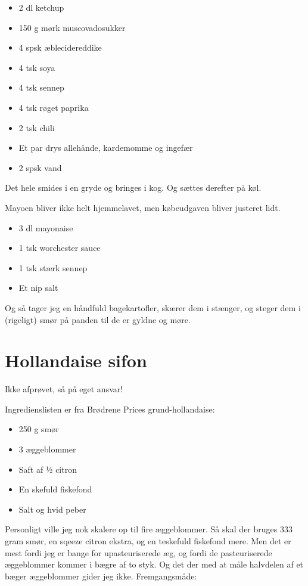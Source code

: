 \documentclass[
]{book}
\providecommand{\tightlist}{%
  \setlength{\itemsep}{0pt}\setlength{\parskip}{0pt}}
\begin{document}
\begin{itemize}
\tightlist
\item
  2 dl ketchup
\item
  150 g mørk muscovadosukker
\item
  4 spsk æblecidereddike
\item
  4 tsk soya
\item
  4 tsk sennep
\item
  4 tsk røget paprika
\item
  2 tsk chili
\item
  Et par drys allehånde, kardemomme og ingefær
\item
  2 spsk vand
\end{itemize}

Det hele smides i en gryde og bringes i kog. Og sættes derefter på køl.

Mayoen bliver ikke helt hjemmelavet, men købeudgaven bliver justeret lidt.

\begin{itemize}
\tightlist
\item
  3 dl mayonaise
\item
  1 tsk worchester sauce
\item
  1 tsk stærk sennep
\item
  Et nip salt
\end{itemize}

Og så tager jeg en håndfuld bagekartofler, skærer dem i stænger, og steger dem i (rigeligt) smør på panden til de er gyldne og møre.

\hypertarget{hollandaise-sifon}{%
\section{Hollandaise sifon}\label{hollandaise-sifon}}

Ikke afprøvet, så på eget ansvar!~

Ingredienslisten er fra Brødrene Prices grund-hollandaise:

\begin{itemize}
\tightlist
\item
  250 g smør
\item
  3 æggeblommer
\item
  Saft af ½ citron
\item
  En skefuld fiskefond
\item
  Salt og hvid peber
\end{itemize}

Personligt ville jeg nok skalere op til fire æggeblommer. Så skal der bruges 333 gram smør, en sqeeze citron ekstra, og en teskefuld fiskefond mere. Men det er mest fordi jeg er bange for upasteuriserede æg, og fordi de pasteuriserede æggeblommer kommer i bægre af to styk. Og det der med at måle halvdelen af et bæger æggeblommer gider jeg ikke. Fremgangsmåde:
\end{document}
